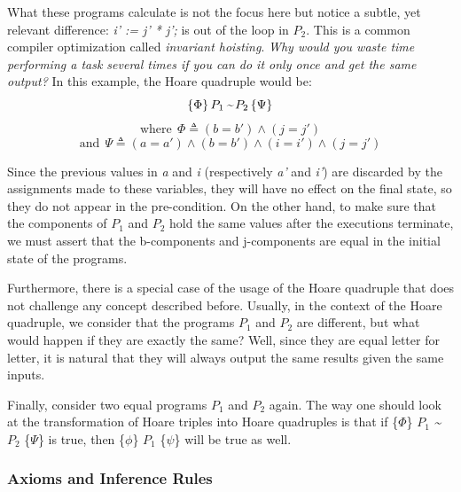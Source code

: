 What these programs calculate is not the focus here but notice a subtle, yet relevant difference: \emph{i' := j' * j';} is out of the loop in \emph{$P_2$}.
This is a common compiler optimization called \emph{invariant hoisting}.
\emph{Why would you waste time performing a task several times if you can do it only once and get the same output?}
In this example, the Hoare quadruple would be:
\[ \{ \Phi \} \, \emph{$P_1$} \, \emph{\textasciitilde} \, \emph{$P_2$} \, \{ \Psi \} \]
\vspace{-20pt} 
\[ \text{where} \ \ \Phi \triangleq (b = b') \land (j = j') \]
\vspace{-25pt} 
\[ \text{and} \ \ \Psi \triangleq (a = a') \land (b = b') \land (i = i') \land (j = j') \]

Since the previous values in \emph{a} and \emph{i} (respectively \emph{a'} and \emph{i'}) are discarded by the assignments made to these variables, they will have no effect on the final state, so they do not appear in the pre-condition.
On the other hand, to make sure that the components of \emph{$P_1$} and \emph{$P_2$} hold the same values after the executions terminate, we must assert that the b-components and j-components are equal in the initial state of the programs. 

Furthermore, there is a special case of the usage of the Hoare quadruple that does not challenge any concept described before.
Usually, in the context of the Hoare quadruple, we consider that the programs \emph{$P_1$} and \emph{$P_2$} are different, but what would happen if they are exactly the same?
Well, since they are equal letter for letter, it is natural that they will always output the same results given the same inputs.

Finally, consider two equal programs \emph{$P_1$} and \emph{$P_2$} again.
The way one should look at the transformation of Hoare triples into Hoare quadruples is that if \{$\Phi$\} \emph{$P_1$} \emph{\textasciitilde} \emph{$P_2$} \{$\Psi$\} is true, then \{$\phi$\} \emph{$P_1$} \{$\psi$\} will be true as well.


\subsubsection{Axioms and Inference Rules}
\label{sub:relational_hoare_logic_formal_proof_rules}

